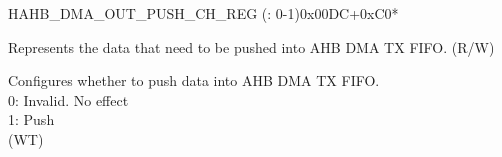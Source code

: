 \begin{register}{H}{AHB\_DMA\_OUT\_PUSH\_CH\_REG (: 0-1)}{0x00DC+0xC0*}\label{regdesc:AHBDMAOUTPUSHCHNREG}
%
%
%
\regnewline%
\begin{regdesc}\begin{reglist}
\label{fielddesc:AHBDMAOUTFIFOWDATACHN}\item [AHB\_DMA\_OUTFIFO\_WDATA\_CH\regindex{n}] Represents the data that need to be pushed into AHB DMA TX FIFO. (R/W)
\label{fielddesc:AHBDMAOUTFIFOPUSHCHN}\item [AHB\_DMA\_OUTFIFO\_PUSH\_CH\regindex{n}] Configures whether to push data into AHB DMA TX FIFO.\\
0: Invalid. No effect\\
1: Push\\ (WT)
\end{reglist}\end{regdesc}
\end{register}


